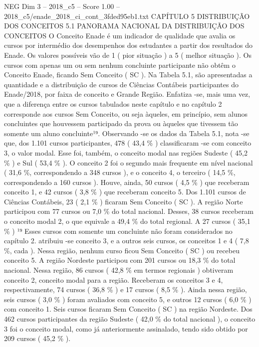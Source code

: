 \begin{textsample}{NEG Dim 3 – 2018\_c5 – Score 1.00 – 2018\_c5/enade\_2018\_ci\_cont\_3fded95eb1.txt}  \label{ex:f3_neg_101}
CAPÍTULO 5 DISTRIBUIÇÃO DOS CONCEITOS 5.1 PANORAMA NACIONAL DA DISTRIBUIÇÃO DOS CONCEITOS O Conceito Enade é um indicador de qualidade que avalia os cursos por intermédio dos desempenhos dos estudantes a partir dos resultados do Enade.
Os valores possíveis vão de 1 ( pior situação ) a 5 ( melhor situação ).
Os cursos com apenas um ou sem nenhum concluinte participante não obtêm o Conceito Enade, ficando Sem Conceito ( SC ).
Na Tabela 5.1, são apresentadas a quantidade e a distribuição de cursos de Ciências Contábeis participantes do Enade/2018, por faixa de conceito e Grande Região.
Enfatiza -se, mais uma vez, que a diferença entre os cursos tabulados neste capítulo e no capítulo 2 corresponde aos cursos Sem Conceito, ou seja àqueles, em princípio, sem alunos concluintes que houvessem participado da prova ou àqueles que tivessem tão somente um aluno concluinte¹⁹.
Observando -se os dados da Tabela 5.1, nota -se que, dos 1.101 cursos participantes, 478 ( 43,4 \% ) classificaram -se com conceito 3, o valor modal.
Esse foi, também, o conceito modal nas regiões Sudeste ( 45,2 \% ) e Sul ( 53,4 \% ).
O conceito 2 foi o segundo mais frequente em nível nacional ( 31,6 \%, correspondendo a 348 cursos ), e o conceito 4, o terceiro ( 14,5 \%, correspondendo a 160 cursos ).
Houve, ainda, 50 cursos ( 4,5 \% ) que receberam conceito 1, e 42 cursos ( 3,8 \% ) que receberam conceito 5.
Dos 1.101 cursos de Ciências Contábeis, 23 ( 2,1 \% ) ficaram Sem Conceito ( SC ).
A região Norte participou com 77 cursos ou 7,0 \% do total nacional.
Desses, 38 cursos receberam o conceito modal 2, o que equivale a 49,4 \% do total regional.
A 27 cursos ( 35,1 \% ) ¹⁹ Esses cursos com somente um concluinte não foram considerados no capítulo 2. atribuiu -se conceito 3, e a outros seis cursos, os conceitos 1 e 4 ( 7,8 \%, cada ).
Nessa região, nenhum curso ficou Sem Conceito ( SC ) ou recebeu conceito 5.
A região Nordeste participou com 201 cursos ou 18,3 \% do total nacional.
Nessa região, 86 cursos ( 42,8 \% em termos regionais ) obtiveram conceito 2, conceito modal para a região.
Receberam os conceitos 3 e 4, respectivamente, 74 cursos ( 36,8 \% ) e 17 cursos ( 8,5 \% ).
Ainda nessa região, seis cursos ( 3,0 \% ) foram avaliados com conceito 5, e outros 12 cursos ( 6,0 \% ) com conceito 1.
Seis cursos ficaram Sem Conceito ( SC ) na região Nordeste.
Dos 462 cursos participantes da região Sudeste ( 42,0 \% do total nacional ), o conceito 3 foi o conceito modal, como já anteriormente assinalado, tendo sido obtido por 209 cursos ( 45,2 \% ).

\end{textsample}
